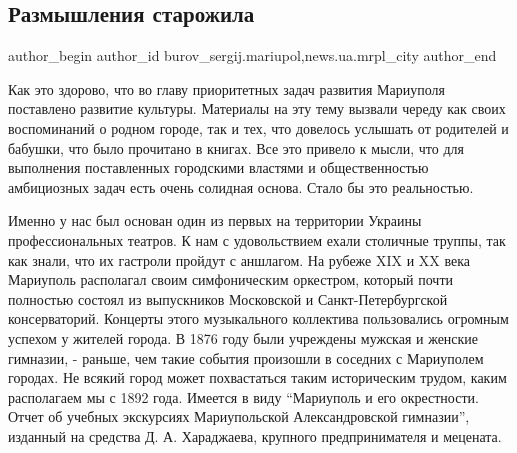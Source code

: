  
 
 
 
 
 
\subsection{Размышления старожила}
\label{sec:19_03_2017.stz.news.ua.mrpl_city.1.razmyshlenia_starozhyla}
 
\ifcmt
 author_begin
   author_id burov_sergij.mariupol,news.ua.mrpl_city
 author_end
\fi



Как это здорово, что во главу приоритетных задач развития Мариуполя поставлено
развитие культуры. Материалы на эту тему вызвали череду как своих воспоминаний
о родном городе, так и тех, что довелось услышать от родителей и бабушки, что
было прочитано в книгах. Все это привело к мысли, что для выполнения
поставленных городскими властями и общественностью амбициозных задач есть очень
солидная основа. Стало бы это реальностью.


Именно у нас был основан один из первых на территории Украины профессиональных
театров. К нам с удовольствием ехали столичные труппы, так как знали, что их
гастроли пройдут с аншлагом. На рубеже XIX и XX века Мариуполь располагал своим
симфоническим оркестром, который почти  полностью состоял из выпускников
Московской и Санкт-Петербургской консерваторий. Концерты этого музыкального
коллектива пользовались огромным  успехом у жителей  города. В 1876 году были
учреждены мужская и женские гимназии, - раньше, чем такие события произошли в
соседних с Мариуполем городах.  Не всякий город может похвастаться таким
историческим трудом, каким располагаем мы с 1892 года. Имеется в виду
\enquote{Мариуполь и его окрестности. Отчет об учебных экскурсиях Мариупольской
Александровской гимназии}, изданный на средства Д. А. Хараджаева, крупного
предпринимателя и мецената.

